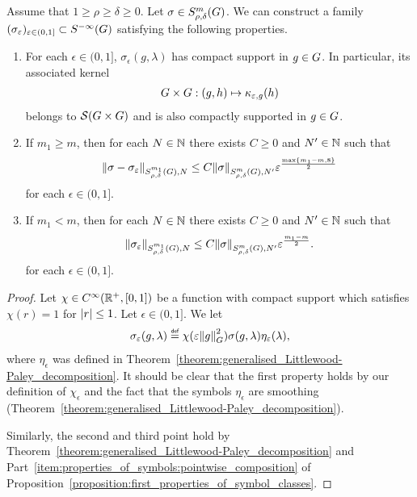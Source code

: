 \begin{proposition}
\label{proposition:approximation_of_symbols}
    Assume that $1 \geq \rho \geq \delta \geq 0$.
    Let $\sigma \in \SymbolClass m {\rho, \delta}$.
    We can construct a family $(\sigma_\epsilon)_{\epsilon \in (0, 1]} \subset \SmoothingSymbols$ satisfying the following properties.
    \begin{enumerate}
        \item For each $\epsilon \in (0, 1]$,
            $\sigma_\epsilon(g, \lambda)$ has compact support in $g \in \Group$.
            In particular, its associated kernel
            \begin{align*}
                \Group \times \Group : (g, h) \mapsto \kappa_{\epsilon, g}(h)
            \end{align*}
            belongs to $\Schwartz {\Group \times \Group}$ and is also compactly supported in $g \in \Group$.
        \item If $m_1 \geq m$, then for each $N \in \N$ there exists $C \geq 0$ and $N' \in \N$ such that
            \begin{align*}
                \SymbolSemiNorm {m_1} {\rho, \delta} N {\sigma - \sigma_\epsilon}
                \leq C \SymbolSemiNorm m {\rho, \delta} {N'} \sigma
                \epsilon^\frac {\max \{m_1 - m, 8\}} 2
            \end{align*}
            for each $\epsilon \in (0, 1]$.
        \item If $m_1 < m$, then for each $N \in \N$ there exists $C \geq 0$ and $N' \in \N$ such that
            \begin{align*}
                \SymbolSemiNorm {m_1} {\rho, \delta} N {\sigma_\epsilon}
                \leq C \SymbolSemiNorm m {\rho, \delta} {N'} \sigma
                \epsilon^\frac {m_1 - m} 2.
            \end{align*}
            for each $\epsilon \in (0, 1]$.
    \end{enumerate}
\end{proposition}
\begin{proof}
    Let $\chi \in \SmoothFunctions {\R^+, [0, 1]}$ be a function with compact support
    which satisfies $\chi(r) = 1$ for $\abs r \leq 1$.
    Let $\epsilon \in (0, 1]$.
    We let
    \begin{align*}
        \sigma_\epsilon(g, \lambda)
        \defeq \chi(\epsilon \norm [\Group] g^2) \sigma(g, \lambda) \eta_\epsilon(\lambda),
    \end{align*}
    where $\eta_\epsilon$ was defined in Theorem~\ref{theorem:generalised_Littlewood-Paley_decomposition}.
    It should be clear that the first property holds by our definition of $\chi_\epsilon$
    and the fact that the symbols $\eta_\epsilon$ are smoothing (Theorem~\ref{theorem:generalised_Littlewood-Paley_decomposition}).

    Similarly,
    the second and third point hold by Theorem~\ref{theorem:generalised_Littlewood-Paley_decomposition}
    and Part~\ref{item:properties_of_symbols:pointwise_composition} of Proposition~\ref{proposition:first_properties_of_symbol_classes}.
\end{proof}

